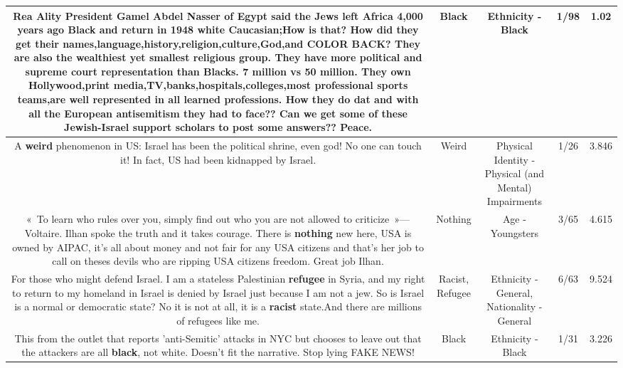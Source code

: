 \documentclass[11pt]{article}
\newlength\mylength
\begin{document}
\begin{center}
\begin{longtable}{|C{.65\mylength}|C{.30\mylength}|C{.12\mylength}|C{.12\mylength}|C{.12\mylength}|}
  \small Rea Ality President Gamel Abdel Nasser of Egypt said the Jews left Africa 4,000 years ago \textbf{Black} and return in 1948 white Caucasian;How is that? How did they get their names,language,history,religion,culture,God,and COLOR BACK?  They are also the wealthiest yet smallest religious group. They have more political and supreme court representation than Blacks. 7 million vs 50 million. They own Hollywood,print media,TV,banks,hospitals,colleges,most professional sports teams,are well represented in all learned professions. How they do dat and with all the European antisemitism they had to face?? Can we get some of these Jewish-Israel support scholars to post some answers?? Peace.\normalsize   & Black & Ethnicity - Black & 1/98 & 1.02 \\  \hline
  \small A \textbf{weird} phenomenon in US: Israel has been the political shrine, even god! No one can touch it! In fact, US had been kidnapped by Israel.\normalsize   & Weird & Physical Identity - Physical (and Mental) Impairments & 1/26 & 3.846 \\  \hline
  \small « To learn who rules over you, simply find out who you are not allowed to criticize »—Voltaire. Ilhan spoke the truth and it takes courage. There is \textbf{nothing} new here, USA is owned by AIPAC, it's all about money and not fair for any USA citizens and that's her job to call on theses devils who are ripping USA citizens freedom. Great job Ilhan.\normalsize   & Nothing & Age - Youngsters & 3/65 & 4.615 \\  \hline
  \small For those who might defend Israel. I am a stateless Palestinian \textbf{refugee} in Syria, and my right to return to my homeland in Israel is denied by Israel just because I am not a jew. So is Israel is a normal or democratic state? No it is not at all, it is a \textbf{racist} state.And there are millions of refugees like me.\normalsize   & Racist, Refugee & Ethnicity - General, Nationality - General & 6/63 & 9.524 \\  \hline
  \small This from the outlet that reports 'anti-Semitic' attacks in NYC but chooses to leave out that the attackers are all \textbf{black}, not white.  Doesn't fit the narrative.  Stop lying FAKE NEWS!\normalsize   & Black & Ethnicity - Black & 1/31 & 3.226 \\  \hline

\end{longtable}
\end{center}
\end{document}
